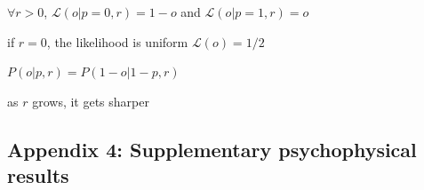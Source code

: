\documentclass[profile,final,english,draft]{article}%
\newcommand{\Ll}{\mathcal{L}}
\newcommand{\seeApp}[1]{Appendix~\ref{app:#1}}
\begin{document}


$\forall r >0$, $\Ll(o|p=0, r)=1-o$ and $\Ll(o|p=1, r)=o$

if $r=0$, the likelihood is uniform $\Ll(o)=1/2$

$P(o | p, r)=P(1-o | 1-p, r)$

as $r$ grows, it gets sharper

\subsection{Appendix 4: Supplementary psychophysical results}
\label{app:results_psycho}

{\tiny
\printbibliography
}
\end{document}
